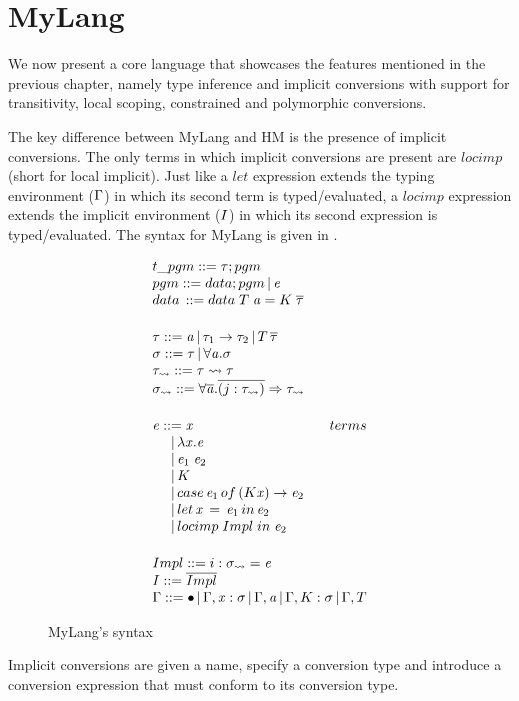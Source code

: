 \chapter{MyLang}
\label{cha:5}

We now present a core language that showcases the features mentioned in the previous chapter, namely type inference and implicit conversions with support for transitivity, local scoping, constrained and polymorphic conversions.

The key difference between MyLang and HM is the presence of implicit conversions. The only terms in which implicit conversions are present are $locimp$ (short for local implicit). Just like a $let$ expression extends the typing environment ($\Gamma$) in which its second term is typed/evaluated, a $locimp$ expression extends the implicit environment ($I$) in which its second expression is typed/evaluated. The syntax for MyLang is given in .

\begin{figure}
   \[
\begin{array}{@{\hspace{0mm}}l@{\hspace{0mm}}}
  t\_pgm ::= \type;pgm\\
  pgm ::= data;pgm\,|\,\term\\
  data\,::= data\;T\;\tyVar=K\;\overline{\type}
  \\[5mm]
  \type ::= \tyVar\,|\,\type_1\to\type_2\,|\,T\,\overline{\type}\\
  \typeS ::= \type\,|\,\forall\tyVar.\typeS\\
  \type_{\rightsquigarrow} ::= \type \rightsquigarrow \type\\
  \typeS_{\rightsquigarrow} ::= \forall \overline {\tyVar} . \overline{(j : \type_{\rightsquigarrow})} \Rightarrow \type_{\rightsquigarrow}
  \\[5mm]
  \term ::= \tmVar \hfill terms\\
  \phantom{\term ::}|\,\lambda \tmVar.\term\\
  \phantom{\term ::}|\,\term_1 \; \term_2\\
  \phantom{\term ::}|\, K\\
  \phantom{\term ::}|\, case \, \term_1 \, of\, (K \tmVar) \rightarrow \term_2\\
  \phantom{\term ::}|\, let \, \tmVar \, =\, \term_1 \,in\, \term_2  \\  
  \phantom{\term ::}|\, locimp \; Impl\; in\; \term_2
  \\[5mm]
  Impl ::= i : \typeS_{\rightsquigarrow}=\term\\
  \imEnv::=\overline{Impl}\\
  \tyEnv::=\bullet\,|\,\tyEnv,\tmVar:\typeS\,|\,\tyEnv,\tyVar\,|\,\tyEnv,K:\typeS\,|\,\tyEnv,T

  \end{array}
\]
  \caption{MyLang's syntax}
  \label{mlsyntax}
\end{figure}
Implicit conversions are given a name, specify a conversion type and introduce a conversion expression that must conform to its conversion type.

